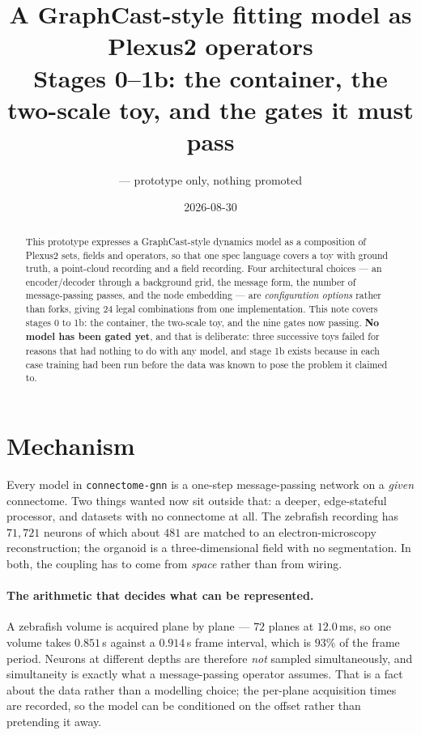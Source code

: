 \documentclass[11pt,a4paper]{article}
\title{\bfseries A GraphCast-style fitting model as Plexus2 operators\\[3pt]
\large Stages 0--1b: the container, the two-scale toy, and the gates it must pass}
\author{\code{Plexus/prototype/graphcast} --- prototype only, nothing promoted}
\date{2026-08-30}
\newcommand{\code}[1]{\texttt{\small #1}}
\begin{document}
\maketitle

\begin{abstract}
\noindent
This prototype expresses a GraphCast-style dynamics model as a composition of Plexus2 sets, fields
and operators, so that one spec language covers a toy with ground truth, a point-cloud recording
and a field recording. Four architectural choices --- an encoder/decoder through a background grid,
the message form, the number of message-passing passes, and the node embedding --- are
\emph{configuration options} rather than forks, giving $24$ legal combinations from one
implementation. This note covers stages 0 to 1b: the container, the two-scale toy, and the nine
gates now passing. \textbf{No model has been gated yet}, and that is deliberate: three successive
toys failed for reasons that had nothing to do with any model, and stage 1b exists because in each
case training had been run before the data was known to pose the problem it claimed to.
\end{abstract}

\section{Mechanism}

Every model in \code{connectome-gnn} is a one-step message-passing network on a \emph{given}
connectome. Two things wanted now sit outside that: a deeper, edge-stateful processor, and datasets
with no connectome at all. The zebrafish recording has $71{,}721$ neurons of which about $481$ are
matched to an electron-microscopy reconstruction; the organoid is a three-dimensional field with no
segmentation. In both, the coupling has to come from \emph{space} rather than from wiring.

\paragraph{The arithmetic that decides what can be represented.} A zebrafish volume is acquired
plane by plane --- $72$ planes at $12.0$\,ms, so one volume takes $0.851$\,s against a $0.914$\,s
frame interval, which is $93\%$ of the frame period. Neurons at different depths are therefore
\emph{not} sampled simultaneously, and simultaneity is exactly what a message-passing operator
assumes. That is a fact about the data rather than a modelling choice; the per-plane acquisition
times are recorded, so the model can be conditioned on the offset rather than pretending it away.
\end{document}
